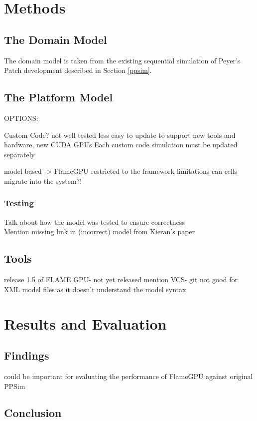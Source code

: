 \documentclass{UoYCSproject}
\begin{document}
\chapter{Methods}
\label{methods}
\section{The Domain Model}
The domain model is taken from the existing sequential simulation of Peyer's Patch development described in Section \ref{ppsim}.

\section{The Platform Model}
OPTIONS:

Custom Code?\cite{phil_diss}
	not well tested
	less easy to update to support new tools and hardware, new CUDA GPUs
		Each custom code simulation must be updated separately


model based -> FlameGPU\cite{flame_keratinocyte}
	restricted to the framework limitations
		can cells migrate into the system?!

\subsection{Testing}
Talk about how the model was tested to ensure correctness\\
Mention missing link in (incorrect) model from Kieran's paper 

\section{Tools}
release 1.5 of FLAME GPU- not yet released
mention VCS- git not good for XML model files as it doesn't understand the model syntax

\chapter{Results and Evaluation}
\section{Findings}
\cite{statistical_tests} could be important for evaluating the performance of FlameGPU against original PPSim


\section{Conclusion}
\end{document}
